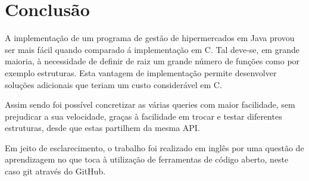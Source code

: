 \documentclass[10pt] {article}
\begin{document}
\section{Conclusão}

A implementação de um programa de gestão de hipermercados em Java provou ser mais fácil quando comparado á implementação em C.
Tal deve-se, em grande maioria, à necessidade de definir de raiz um grande número de funções como por exemplo estruturas.
Esta vantagem de implementação permite desenvolver soluções adicionais que teriam um custo considerável em C.

Assim sendo foi possível concretizar as várias queries com maior facilidade, sem prejudicar a sua velocidade, graças à facilidade em trocar e testar diferentes estruturas, desde que estas partilhem da mesma API.

Em jeito de esclarecimento, o trabalho foi realizado em inglês por uma questão de aprendizagem no que toca à utilização de ferramentas de código aberto, neste caso git através do GitHub.
\end{document}
